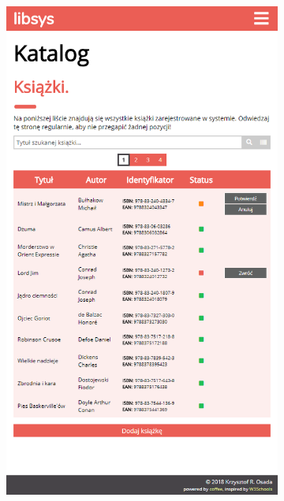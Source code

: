 \documentclass[12pt, a4paper]{article}
\begin{document}
\begin{figure}[h]
\centering
\begin{subfigure}{.48\textwidth}
    \centering
    \includegraphics[width=.75\linewidth]{img/libsys_catalog_1.png}
\end{subfigure}\quad
\begin{subfigure}{.48\textwidth}
    \centering

\end{subfigure}
\end{figure}
\end{document}
